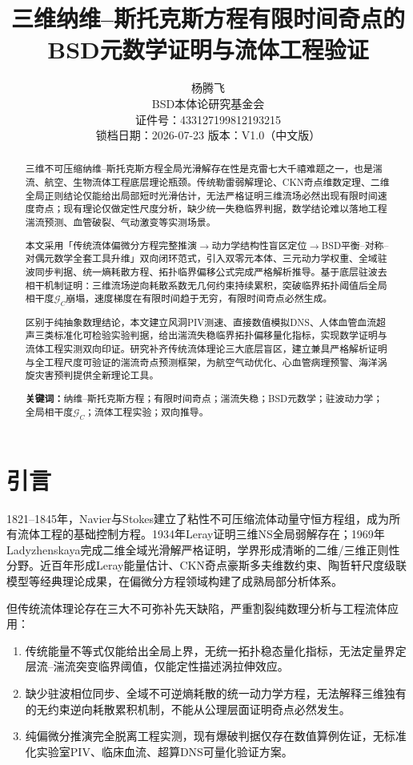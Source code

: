 \documentclass[11pt,a4paper]{ctexart}
\title{\textbf{三维纳维--斯托克斯方程有限时间奇点的BSD元数学证明与流体工程验证}}
\author{杨腾飞 \\
\small BSD本体论研究基金会 \\
\small 证件号：433127199812193215 \\
\small 锁档日期：2026-07-23 \quad 版本：V1.0（中文版）}
\date{}
\theoremstyle{remark}
\newcommand{\GC}{\mathcal{G}_{\!C}}
\begin{document}
\maketitle

\begin{abstract}
三维不可压缩纳维--斯托克斯方程全局光滑解存在性是克雷七大千禧难题之一，也是湍流、航空、生物流体工程底层理论瓶颈。传统勒雷弱解理论、CKN奇点维数定理、二维全局正则结论仅能给出局部短时光滑估计，无法严格证明三维流场必然出现有限时间速度奇点；现有理论仅做定性尺度分析，缺少统一失稳临界判据，数学结论难以落地工程湍流预测、血管破裂、气动激变等实测场景。

本文采用「传统流体偏微分方程完整推演$\to$动力学结构性盲区定位$\to$BSD平衡--对称--对偶元数学全套工具升维」双向闭环范式，引入双零元本体、三元动力学权重、全域驻波同步判据、统一熵耗散方程、拓扑临界偏移公式完成严格解析推导。基于底层驻波去相干机制证明：三维流场逆向耗散系数无几何约束持续累积，突破临界拓扑阈值后全局相干度$\GC$崩塌，速度梯度在有限时间趋于无穷，有限时间奇点必然生成。

区别于纯抽象数理结论，本文建立风洞PIV测速、直接数值模拟DNS、人体血管血流超声三类标准化可检验实验判据，给出湍流失稳临界拓扑偏移量化指标，实现数学证明与流体工程实测双向印证。研究补齐传统流体理论三大底层盲区，建立兼具严格解析证明与全工程尺度可验证的湍流奇点预测框架，为航空气动优化、心血管病理预警、海洋涡旋灾害预判提供全新理论工具。

\medskip
\noindent\textbf{关键词：}纳维--斯托克斯方程；有限时间奇点；湍流失稳；BSD元数学；驻波动力学；全局相干度$\GC$；流体工程实验；双向推导。
\end{abstract}

\section{引言}\label{sec:intro}

1821--1845年，Navier与Stokes建立了粘性不可压缩流体动量守恒方程组\citep{Navier1821,Stokes1845}，成为所有流体工程的基础控制方程。1934年Leray\citep{Leray1934}证明三维NS全局弱解存在；1969年Ladyzhenskaya\citep{Ladyzhenskaya1969}完成二维全域光滑解严格证明，学界形成清晰的二维/三维正则性分野。近百年形成Leray能量估计、CKN奇点豪斯多夫维数约束\citep{CKN1982}、陶哲轩尺度级联模型\citep{Tao2016}等经典理论成果，在偏微分方程领域构建了成熟局部分析体系。

但传统流体理论存在三大不可弥补先天缺陷，严重割裂纯数理分析与工程流体应用：
\begin{enumerate}
    \item 传统能量不等式仅能给出全局上界，无统一拓扑稳态量化指标，无法定量界定层流--湍流突变临界阈值，仅能定性描述涡拉伸效应。
    \item 缺少驻波相位同步、全域不可逆熵耗散的统一动力学方程，无法解释三维独有的无约束逆向耗散累积机制，不能从公理层面证明奇点必然发生。
    \item 纯偏微分推演完全脱离工程实测，现有爆破判据仅存在数值算例佐证，无标准化实验室PIV、临床血流、超算DNS可量化验证方案。
\end{enumerate}
\end{document}

